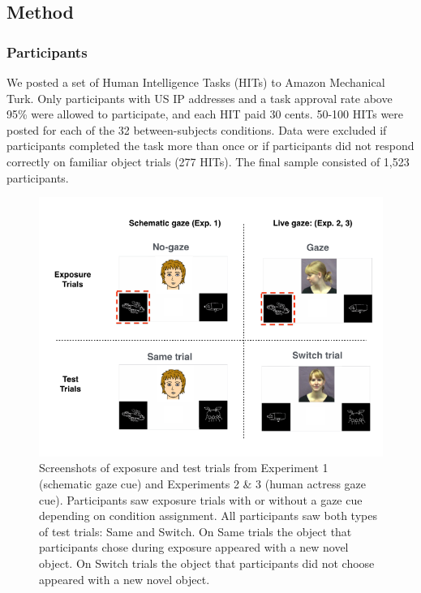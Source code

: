 \documentclass[authoryear, review]{elsarticle}
\newenvironment{CodeChunk}{}{}
\begin{document}
\subsection{Method}\label{method}

\subsubsection{Participants}\label{participants}

We posted a set of Human Intelligence Tasks (HITs) to Amazon Mechanical
Turk. Only participants with US IP addresses and a task approval rate
above 95\% were allowed to participate, and each HIT paid 30 cents.
50-100 HITs were posted for each of the 32 between-subjects conditions.
Data were excluded if participants completed the task more than once or
if participants did not respond correctly on familiar object trials (277
HITs). The final sample consisted of 1,523 participants.

\begin{CodeChunk}
\begin{figure}[tb]
\includegraphics{figs/stimuli-1} \caption[Screenshots of exposure and test trials from Experiment 1 (schematic gaze cue) and Experiments 2 \& 3 (human actress gaze cue)]{Screenshots of exposure and test trials from Experiment 1 (schematic gaze cue) and Experiments 2 \& 3 (human actress gaze cue). Participants saw exposure trials with or without a gaze cue depending on condition assignment. All participants saw both types of test trials: Same and Switch. On Same trials the object that participants chose during exposure appeared with a new novel object. On Switch trials the object that participants did not choose appeared with a new novel object.}\label{fig:stimuli}
\end{figure}
\end{CodeChunk}
\end{document}
